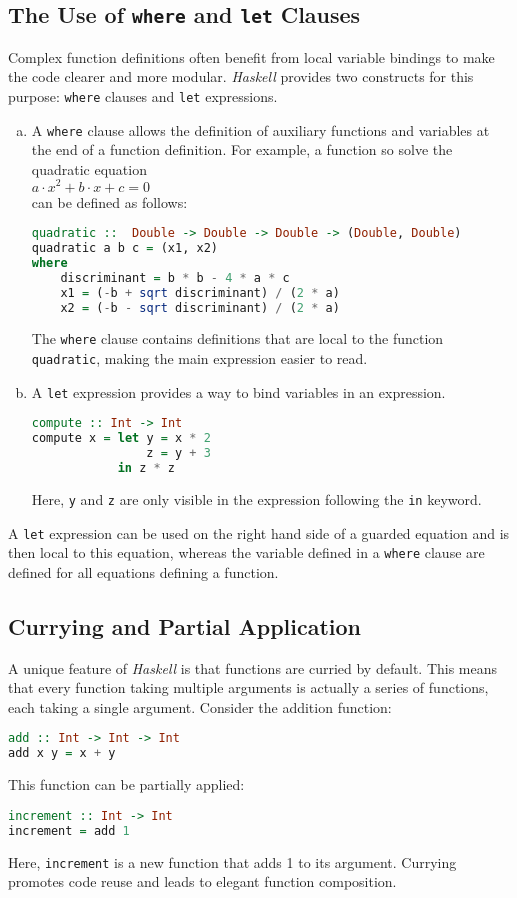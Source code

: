 \subsection{The Use of \texttt{where} and \texttt{let} Clauses}
Complex function definitions often benefit from local variable bindings to make the code clearer and more
modular. \textsl{Haskell} provides two constructs for this purpose: \texttt{where} clauses and \texttt{let} expressions.
\begin{enumerate}[(a)]
\item A \texttt{where} clause allows the definition of auxiliary functions and variables at the end of a function
  definition. For example, a function so solve the quadratic equation
  \\[0.2cm]
  \hspace*{1.3cm}
  $a \cdot x^2 + b \cdot x + c = 0$
  \\[0.2cm]
  can be defined as follows:
  \begin{lstlisting}[style=haskellstyle, language=Haskell]
quadratic ::  Double -> Double -> Double -> (Double, Double)
quadratic a b c = (x1, x2)
where
    discriminant = b * b - 4 * a * c
    x1 = (-b + sqrt discriminant) / (2 * a)
    x2 = (-b - sqrt discriminant) / (2 * a)
\end{lstlisting}
The \texttt{where} clause contains definitions that are local to the function \texttt{quadratic}, making the
main expression easier to read. 
\item A \texttt{let} expression provides a way to bind variables in an expression.
\begin{lstlisting}[style=haskellstyle, language=Haskell]
compute :: Int -> Int
compute x = let y = x * 2
                z = y + 3
            in z * z
\end{lstlisting}
Here, \texttt{y} and \texttt{z} are only visible in the expression following the \texttt{in} keyword.
\end{enumerate}
  A \texttt{let} expression can be used on the right hand side of a guarded equation and is then
  local to this equation, whereas the variable defined in a \texttt{where} clause are defined for all equations
  defining a function.

\subsection{Currying and Partial Application}
A unique feature of \textsl{Haskell} is that functions are curried by default. This means that every function taking multiple arguments is actually a series of functions, each taking a single argument. Consider the addition function:
\begin{lstlisting}[style=haskellstyle, language=Haskell]
add :: Int -> Int -> Int
add x y = x + y
\end{lstlisting}
This function can be partially applied:
\begin{lstlisting}[style=haskellstyle, language=Haskell]
increment :: Int -> Int
increment = add 1
\end{lstlisting}
Here, \texttt{increment} is a new function that adds 1 to its argument. Currying promotes code reuse and leads to elegant function composition.

